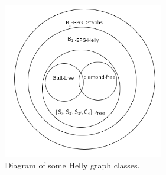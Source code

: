  \begin{figure}[htb]	
 \center%
 \includegraphics[width=7cm]{./img/diagramS3Free.png}
 \caption{Diagram of some Helly graph classes.}
\label{fig:diagramS3Free}
\end{figure}  
 